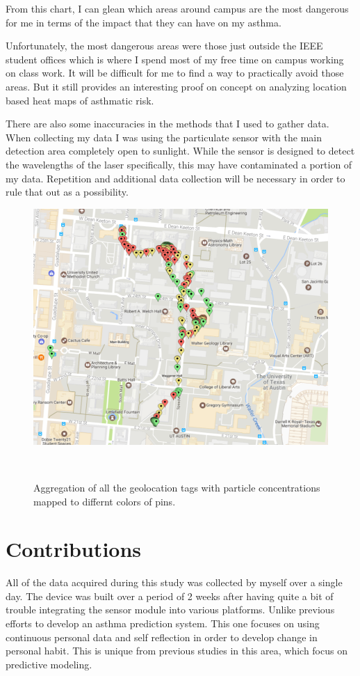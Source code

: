 \documentclass{sigchi}
\begin{document}
From this chart, I can glean which areas
around campus are the most dangerous for me in terms of the impact that they can have on
my asthma.

Unfortunately, the most dangerous areas were those just outside the IEEE student
offices which is where I spend most of my free time on campus working on class work.
It will be difficult for me to find a way to practically avoid those areas. But it
still provides an interesting proof on concept on analyzing location based heat maps
of asthmatic risk.

There are also some inaccuracies in the methods that I used to gather data. When
collecting my data I was using the particulate sensor with the main detection area
completely open to sunlight. While the sensor is designed to detect the wavelengths
of the laser specifically, this may have contaminated a portion of my data. Repetition
and additional data collection will be necessary in order to rule that out as a
possibility. 

\begin{figure}
\centering
  \includegraphics[width=0.9\columnwidth]{figures/map}
  \caption{ Aggregation of all the geolocation tags with particle concentrations
  mapped to differnt colors of pins.
  }~\label{fig:figure4}
\end{figure}

\section{Contributions}

All of the data acquired during this study was collected by myself over a single day.
The device was built over a period of 2 weeks after having quite a bit of trouble
integrating the sensor module into various platforms. Unlike previous efforts to develop
an asthma prediction system. This one focuses on using continuous personal data
and self reflection in order to develop change in personal habit. This is unique from
previous studies in this area, which focus on predictive modeling. \cite{lowpower, farr_2016}
\end{document}
